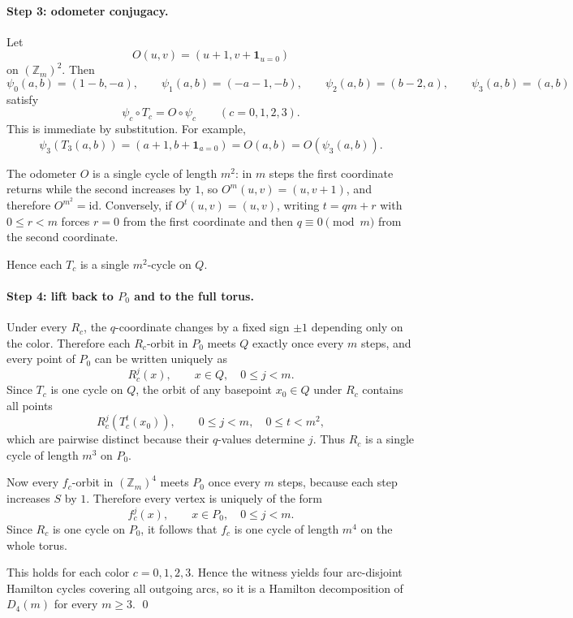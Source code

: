 \documentclass[11pt]{article}
\newcommand{\Zm}{\mathbb Z_m}
\newcommand{\I}{\mathbf 1}
\begin{document}
\paragraph{Step 3: odometer conjugacy.}
Let
\[
O(u,v)=(u+1,v+\I_{u=0})
\]
on $(\Zm)^2$. Then
\[
\psi_0(a,b)=(1-b,-a),
\qquad
\psi_1(a,b)=(-a-1,-b),
\qquad
\psi_2(a,b)=(b-2,a),
\qquad
\psi_3(a,b)=(a,b)
\]
satisfy
\[
\psi_c\circ T_c=O\circ \psi_c
\qquad(c=0,1,2,3).
\]
This is immediate by substitution. For example,
\[
\psi_3(T_3(a,b))=(a+1,b+\I_{a=0})=O(a,b)=O(\psi_3(a,b)).
\]

The odometer $O$ is a single cycle of length $m^2$: in $m$ steps the first coordinate returns while the second increases by $1$, so $O^m(u,v)=(u,v+1)$, and therefore $O^{m^2}=\mathrm{id}$. Conversely, if $O^t(u,v)=(u,v)$, writing $t=qm+r$ with $0\le r<m$ forces $r=0$ from the first coordinate and then $q\equiv0\pmod m$ from the second coordinate.

Hence each $T_c$ is a single $m^2$-cycle on $Q$.

\paragraph{Step 4: lift back to $P_0$ and to the full torus.}
Under every $R_c$, the $q$-coordinate changes by a fixed sign $\pm1$ depending only on the color. Therefore each $R_c$-orbit in $P_0$ meets $Q$ exactly once every $m$ steps, and every point of $P_0$ can be written uniquely as
\[
R_c^j(x),\qquad x\in Q,\quad 0\le j<m.
\]
Since $T_c$ is one cycle on $Q$, the orbit of any basepoint $x_0\in Q$ under $R_c$ contains all points
\[
R_c^j(T_c^t(x_0)),\qquad 0\le j<m,\quad 0\le t<m^2,
\]
which are pairwise distinct because their $q$-values determine $j$. Thus $R_c$ is a single cycle of length $m^3$ on $P_0$.

Now every $f_c$-orbit in $(\Zm)^4$ meets $P_0$ once every $m$ steps, because each step increases $S$ by $1$. Therefore every vertex is uniquely of the form
\[
f_c^j(x),\qquad x\in P_0,\quad 0\le j<m.
\]
Since $R_c$ is one cycle on $P_0$, it follows that $f_c$ is one cycle of length $m^4$ on the whole torus.

This holds for each color $c=0,1,2,3$. Hence the witness yields four arc-disjoint Hamilton cycles covering all outgoing arcs, so it is a Hamilton decomposition of $D_4(m)$ for every $m\ge 3$. \qed
\end{document}
